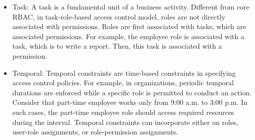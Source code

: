 \begin{itemize}
  \item Task: A task is a fundamental unit of a business activity. Different from core RBAC, in task-role-based access control model, roles are not directly associated with permissions. Roles are first associated with tasks, which are associated permissions. For example, the employee role is associated with a task, which is to write a report. Then, this task is associated with a permission.

  \item Temporal:  Temporal constraints are time-based constraints in specifying access
	control policies. For example, in organizations, 	periodic temporal durations are enforced while a
	specific role is permitted to conduct an action. Consider that part-time employee works only from 9:00 a.m. to 3:00 p.m.
	In such cases, the part-time employee role should access required resources during the interval. 
	Temporal constraints can incorporate either on roles, user-role assignments, or role-permission assignments.   
	
\end{itemize}
